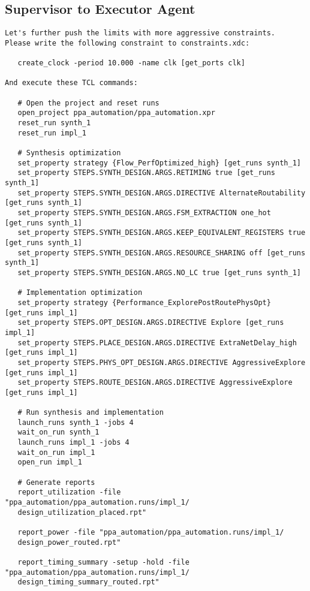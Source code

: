 \subsection{Supervisor to Executor Agent}
\vspace{-0.5em}
\begin{supervisorbox}
\begin{lstlisting}
Let's further push the limits with more aggressive constraints. 
Please write the following constraint to constraints.xdc:

   create_clock -period 10.000 -name clk [get_ports clk]

And execute these TCL commands:

   # Open the project and reset runs
   open_project ppa_automation/ppa_automation.xpr
   reset_run synth_1
   reset_run impl_1

   # Synthesis optimization
   set_property strategy {Flow_PerfOptimized_high} [get_runs synth_1]
   set_property STEPS.SYNTH_DESIGN.ARGS.RETIMING true [get_runs synth_1]
   set_property STEPS.SYNTH_DESIGN.ARGS.DIRECTIVE AlternateRoutability [get_runs synth_1]
   set_property STEPS.SYNTH_DESIGN.ARGS.FSM_EXTRACTION one_hot [get_runs synth_1]
   set_property STEPS.SYNTH_DESIGN.ARGS.KEEP_EQUIVALENT_REGISTERS true [get_runs synth_1]
   set_property STEPS.SYNTH_DESIGN.ARGS.RESOURCE_SHARING off [get_runs synth_1]
   set_property STEPS.SYNTH_DESIGN.ARGS.NO_LC true [get_runs synth_1]

   # Implementation optimization
   set_property strategy {Performance_ExplorePostRoutePhysOpt} [get_runs impl_1]
   set_property STEPS.OPT_DESIGN.ARGS.DIRECTIVE Explore [get_runs impl_1]
   set_property STEPS.PLACE_DESIGN.ARGS.DIRECTIVE ExtraNetDelay_high [get_runs impl_1]
   set_property STEPS.PHYS_OPT_DESIGN.ARGS.DIRECTIVE AggressiveExplore [get_runs impl_1]
   set_property STEPS.ROUTE_DESIGN.ARGS.DIRECTIVE AggressiveExplore [get_runs impl_1]

   # Run synthesis and implementation
   launch_runs synth_1 -jobs 4
   wait_on_run synth_1
   launch_runs impl_1 -jobs 4
   wait_on_run impl_1
   open_run impl_1

   # Generate reports
   report_utilization -file "ppa_automation/ppa_automation.runs/impl_1/
   design_utilization_placed.rpt"
   
   report_power -file "ppa_automation/ppa_automation.runs/impl_1/
   design_power_routed.rpt"
   
   report_timing_summary -setup -hold -file "ppa_automation/ppa_automation.runs/impl_1/
   design_timing_summary_routed.rpt"
\end{lstlisting}
\end{supervisorbox}

